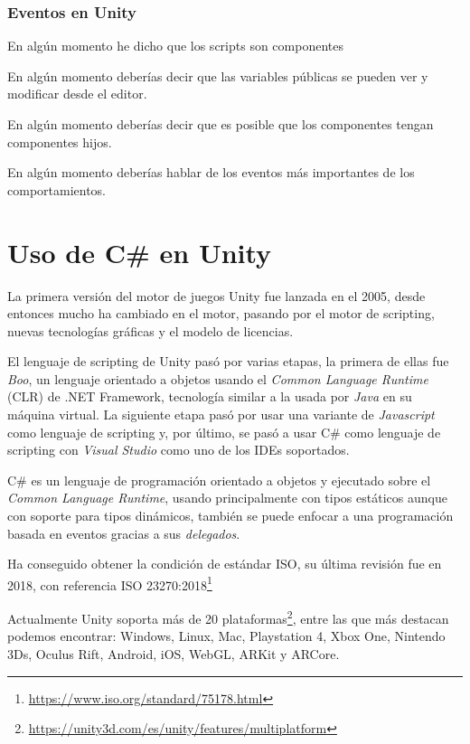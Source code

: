 \documentclass{pre-tfg}
\begin{document}
\subsubsection{Eventos en Unity}



En algún momento he dicho que los scripts son componentes

En algún momento deberías decir que las variables públicas se pueden ver y modificar desde el editor.

En algún momento deberías decir que es posible que los componentes tengan componentes hijos.

En algún momento deberías hablar de los eventos más importantes de los comportamientos.



\section{Uso de C\# en Unity}

La primera versión del motor de juegos Unity fue lanzada en el 2005, desde entonces mucho ha cambiado en el motor, pasando por el motor de scripting, nuevas tecnologías gráficas y el modelo de licencias.

El lenguaje de scripting de Unity pasó por varias etapas, la primera de ellas fue \emph{Boo}, un lenguaje orientado a objetos usando el \emph{Common Language Runtime} (CLR) de .NET Framework, tecnología similar a la usada por \emph{Java} en su máquina virtual. La siguiente etapa pasó por usar una variante de \emph{Javascript} como lenguaje de scripting y, por último, se pasó a usar C\# como lenguaje de scripting con \emph{Visual Studio} como uno de los IDEs soportados.

C\# es un lenguaje de programación orientado a objetos y ejecutado sobre el \emph{Common Language Runtime}, usando principalmente con tipos estáticos aunque con soporte para tipos dinámicos, también se puede enfocar a una programación basada en eventos gracias a sus \emph{delegados}.

Ha conseguido obtener la condición de estándar ISO, su última revisión fue en 2018, con referencia ISO 23270:2018\footnote{\url{https://www.iso.org/standard/75178.html}}

Actualmente Unity soporta más de 20 plataformas\footnote{\url{https://unity3d.com/es/unity/features/multiplatform}}, entre las que más destacan podemos encontrar: Windows, Linux, Mac, Playstation 4, Xbox One, Nintendo 3Ds, Oculus Rift, Android, iOS, WebGL, ARKit y ARCore.
\end{document}
